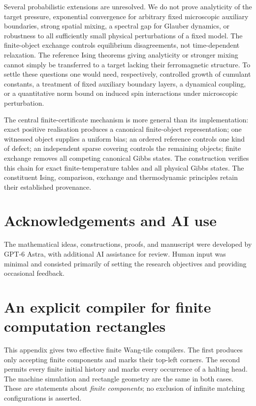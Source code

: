 \documentclass[11pt,reqno]{amsart}
\numberwithin{equation}{section}
\theoremstyle{definition}
\theoremstyle{remark}
\begin{document}
Several probabilistic extensions are unresolved. We do not prove analyticity of the target pressure, exponential convergence for arbitrary fixed microscopic auxiliary boundaries, strong spatial mixing, a spectral gap for Glauber dynamics, or robustness to all sufficiently small physical perturbations of a fixed model. The finite-object exchange controls equilibrium disagreements, not time-dependent relaxation. The reference Ising theorems giving analyticity or stronger mixing cannot simply be transferred to a target lacking their ferromagnetic structure. To settle these questions one would need, respectively, controlled growth of cumulant constants, a treatment of fixed auxiliary boundary layers, a dynamical coupling, or a quantitative norm bound on induced spin interactions under microscopic perturbation.

The central finite-certificate mechanism is more general than its implementation: exact positive realisation produces a canonical finite-object representation; one witnessed object supplies a uniform bias; an ordered reference controls one kind of defect; an independent sparse covering controls the remaining objects; finite exchange removes all competing canonical Gibbs states. The construction verifies this chain for exact finite-temperature tables and all physical Gibbs states. The constituent Ising, comparison, exchange and thermodynamic principles retain their established provenance.


\section*{Acknowledgements and AI use}
\label{sec:acknowledgements}
The mathematical ideas, constructions, proofs, and manuscript were developed by GPT-6 Astra, with additional AI assistance for review. Human input was minimal and consisted primarily of setting the research objectives and providing occasional feedback.

\appendix

\section{An explicit compiler for finite computation rectangles}
\label{appcomp:section}
\label{app:compiler}

This appendix gives two effective finite Wang-tile compilers.  The first
produces only accepting finite components and marks their top-left corners.
The second permits every finite initial history and marks every occurrence
of a halting head.  The machine simulation and rectangle geometry are the
same in both cases.  These are statements about \emph{finite components};
no exclusion of infinite matching configurations is asserted.
\end{document}
